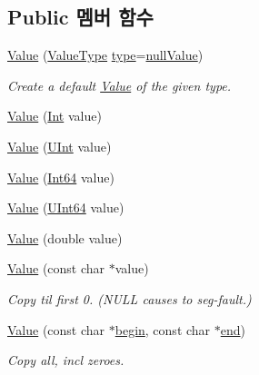 \subsection*{Public 멤버 함수}
\begin{DoxyCompactItemize}
\item 
\hyperlink{class_json_1_1_value_ada6ba1369448fb0240bccc36efaa46f7}{Value} (\hyperlink{namespace_json_a7d654b75c16a57007925868e38212b4e}{Value\+Type} \hyperlink{class_json_1_1_value_a8ce61157a011894f0252ceed232312de}{type}=\hyperlink{namespace_json_a7d654b75c16a57007925868e38212b4ea7d9899633b4409bd3fc107e6737f8391}{null\+Value})
\begin{DoxyCompactList}\small\item\em Create a default \hyperlink{class_json_1_1_value}{Value} of the given type. \end{DoxyCompactList}\item 
\hyperlink{class_json_1_1_value_a4744ae571fcf34f4b16a2257b3b3b585}{Value} (\hyperlink{class_json_1_1_value_abdf7a7ff73eb130ffcab28504ffdb405}{Int} value)
\item 
\hyperlink{class_json_1_1_value_ae67a857b01286e3499a87e95be848d20}{Value} (\hyperlink{class_json_1_1_value_a0933d59b45793ae4aade1757c322a98d}{U\+Int} value)
\item 
\hyperlink{class_json_1_1_value_ab1cdc3d9a4d4cc03fa01439d43ceb1b5}{Value} (\hyperlink{class_json_1_1_value_a1b86af9f85f0f1baa972c3319fa22695}{Int64} value)
\item 
\hyperlink{class_json_1_1_value_a8adda58d5ae17bf7ca6a53bab4a7b69c}{Value} (\hyperlink{class_json_1_1_value_a8b62564be8c087c6d18de180ff4e13e3}{U\+Int64} value)
\item 
\hyperlink{class_json_1_1_value_a32228cc84d83200cca8441451997996c}{Value} (double value)
\item 
\hyperlink{class_json_1_1_value_ad87b849356816aca75995dd07302e49d}{Value} (const char $\ast$value)
\begin{DoxyCompactList}\small\item\em Copy til first 0. (N\+U\+LL causes to seg-\/fault.) \end{DoxyCompactList}\item 
\hyperlink{class_json_1_1_value_a39fa09d1902efbd4350e1236db920571}{Value} (const char $\ast$\hyperlink{class_json_1_1_value_a015459a3950c198d63a2d3be8f5ae296}{begin}, const char $\ast$\hyperlink{class_json_1_1_value_a3e443cd0ef24f7e028b175e47ee045e0}{end})
\begin{DoxyCompactList}\small\item\em Copy all, incl zeroes. \end{DoxyCompactList}\item 

\end{DoxyCompactItemize}
